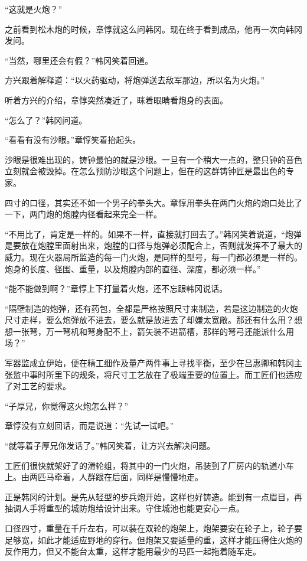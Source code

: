 “这就是火炮？”

之前看到松木炮的时候，章惇就这么问韩冈。现在终于看到成品，他再一次向韩冈发问。

“当然，哪里还会有假？”韩冈笑着回道。

方兴跟着解释道：“以火药驱动，将炮弹送去敌军那边，所以名为火炮。”

听着方兴的介绍，章惇突然凑近了，眯着眼睛看炮身的表面。

“怎么了？”韩冈问道。

“看看有没有沙眼。”章惇笑着抬起头。

沙眼是很难出现的，铸钟最怕的就是沙眼。一旦有一个稍大一点的，整只钟的音色立刻就会被毁掉。在怎么预防沙眼这个问题上，但在的这群铸钟匠是最出色的专家。

四寸的口径，其实还不如一个男子的拳头大。章惇用拳头在两门火炮的炮口处比了一下，两门炮的炮膛内径看起来完全一样。

“不用比了，肯定是一样的。如果不一样，直接就打回去了。”韩冈笑着说道，“炮弹是要放在炮膛里面射出来，炮膛的口径与炮弹必须配合上，否则就发挥不了最大的威力。现在火器局所监造的每一门火炮，是同样的型号，每一门都必须是一样的。炮身的长度、径围、重量，以及炮膛内部的直径、深度，都必须一样。”

“能不能做到啊？”章惇上下打量着火炮，还不忘跟韩冈说话。

“隔壁制造的炮弹，还有药包，全都是严格按照尺寸来制造，若是这边制造的火炮尺寸走样，要么炮弹放不进去，要么就是放进去了却嫌太宽敞。那还有什么用？想想一张弩，万一弩机和弩身配不上，箭矢装不进箭槽，那样的弩弓还能派什么用场？”

军器监成立伊始，便在精工细作及量产两件事上寻找平衡，至少在吕惠卿和韩冈主张监中事时所里下的规条，将尺寸工艺放在了极端重要的位置上。而工匠们也适应了对工艺的要求。

“子厚兄，你觉得这火炮怎么样？”

章惇没有立刻回话，而是说道：“先试一试吧。”

“就等着子厚兄你发话了。”韩冈笑着，让方兴去解决问题。

工匠们很快就架好了的滑轮组，将其中的一门火炮，吊装到了厂房内的轨道小车上。由两匹马牵着，人群跟在后面，同样是慢慢地走。

正是韩冈的计划。是先从轻型的步兵炮开始，这样也好铸造。能到有一点眉目，再抽调人手将重型的城防炮给设计出来。守住城池也能更安心一点。

口径四寸，重量在千斤左右，可以装在双轮的炮架上，炮架要安在轮子上，轮子要足够宽，如此才能适应野地的穿行。但炮架又要适量的重，这样才能压得住火炮的反作用力，但又不能台太重，这样才能用最少的马匹一起拖着随军走。

